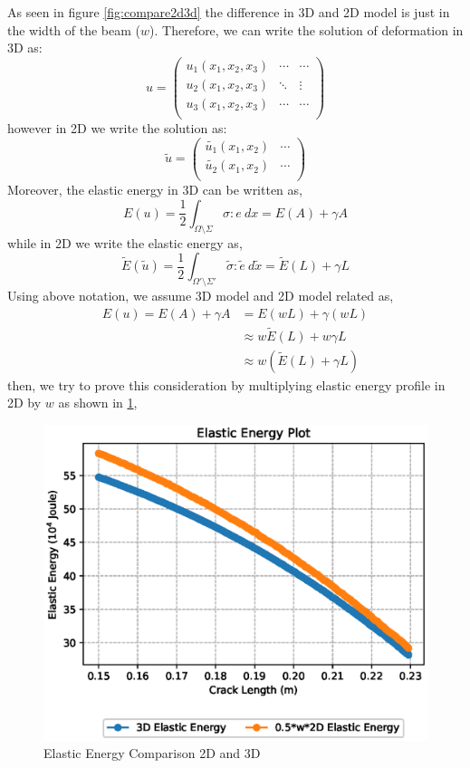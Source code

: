 \documentclass[a4paper,11pt]{article}
\begin{document}
As seen in figure \ref{fig:compare2d3d} the difference in 3D and 2D model is just in the width of the beam ($w$). Therefore, we can write the solution of deformation in 3D as:
\begin{equation*}
u = \begin{pmatrix}
u_1(x_1,x_2,x_3) & \cdots & \cdots\\
u_2(x_1,x_2,x_3) & \ddots & \vdots\\
u_3(x_1,x_2,x_3) & \cdots & \cdots\\
\end{pmatrix}
\end{equation*}
however in 2D we write the solution as:
\begin{equation*}
\tilde{u} = \begin{pmatrix}
\tilde{u_1}(x_1,x_2) & \cdots\\
\tilde{u_2}(x_1,x_2) & \cdots\\
\end{pmatrix}
\end{equation*}
Moreover, the elastic energy in 3D can be written as,
\begin{equation*}
E(u) = \frac{1}{2} \int_{\Omega \setminus \Sigma} \sigma : e \ dx = E(A) + \gamma A
\end{equation*}
while in 2D we write the elastic energy as,
\begin{equation*}
\tilde{E}(\tilde{u}) = \frac{1}{2} \int_{\Omega' \setminus \Sigma'} \tilde{\sigma} : \tilde{e} \ d\tilde{x} = \tilde{E}(L) + \gamma L
\end{equation*}
Using above notation, we assume 3D model and 2D model related as,
\begin{equation*}
\begin{aligned}
E(u) = E(A) + \gamma A &= E(wL) + \gamma (wL)\\
&\approx w \tilde{E}(L) + w \gamma L\\
&\approx w (\tilde{E}(L) + \gamma L)
\end{aligned}
\end{equation*}
then, we try to prove this consideration by multiplying elastic energy profile in 2D by $w$ as shown in \ref{fig:elasticcompare},
\begin{figure}[h!]
	\centering
	\includegraphics[width=0.7\linewidth]{picture/conference/elastic_compare}
	\caption{Elastic Energy Comparison 2D and 3D}
	\label{fig:elasticcompare}
\end{figure}
\end{document}
